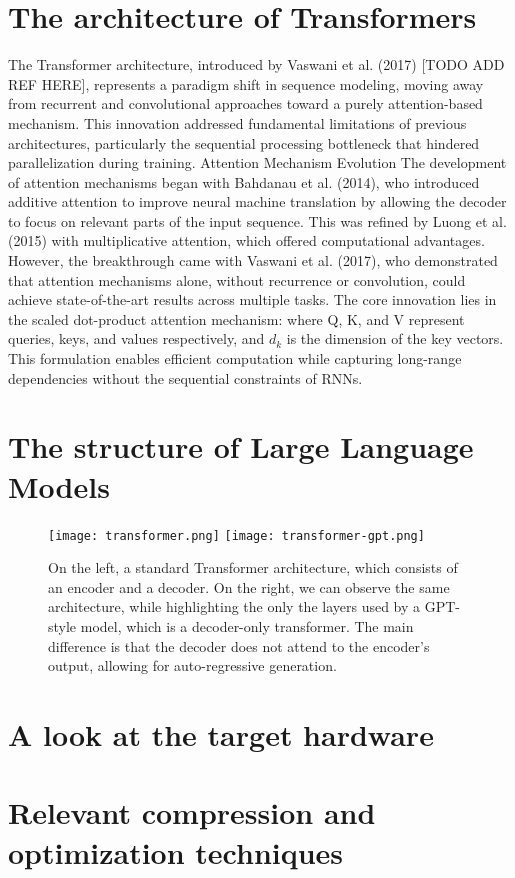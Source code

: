 \section{The architecture of Transformers} \label{transformer_architecture}
The Transformer architecture, introduced by Vaswani et al. (2017) [TODO ADD REF HERE], represents a paradigm shift in sequence modeling, moving away from recurrent and convolutional approaches toward a purely attention-based mechanism. This innovation addressed fundamental limitations of previous architectures, particularly the sequential processing bottleneck that hindered parallelization during training.
Attention Mechanism Evolution
The development of attention mechanisms began with Bahdanau et al. (2014), who introduced additive attention to improve neural machine translation by allowing the decoder to focus on relevant parts of the input sequence. This was refined by Luong et al. (2015) with multiplicative attention, which offered computational advantages. However, the breakthrough came with Vaswani et al. (2017), who demonstrated that attention mechanisms alone, without recurrence or convolution, could achieve state-of-the-art results across multiple tasks.
The core innovation lies in the scaled dot-product attention mechanism:
where Q, K, and V represent queries, keys, and values respectively, and $d_{k}$ is the dimension of the key vectors. This formulation enables efficient computation while capturing long-range dependencies without the sequential constraints of RNNs.

\section{The structure of Large Language Models}

\begin{figure}[htbp]
    \centering
    \texttt{[image: transformer.png]}
    \hfill
    \texttt{[image: transformer-gpt.png]}
    \caption{On the left, a standard Transformer architecture, which consists of an encoder and a decoder. On the right, we can observe the same architecture, while highlighting the only the layers used by a GPT-style model, which is a decoder-only transformer. The main difference is that the decoder does not attend to the encoder's output, allowing for auto-regressive generation.}
    \label{fig:sidebyside}
\end{figure}

\section{A look at the target hardware} \label{target_hardware}

\section{Relevant compression and optimization techniques}


